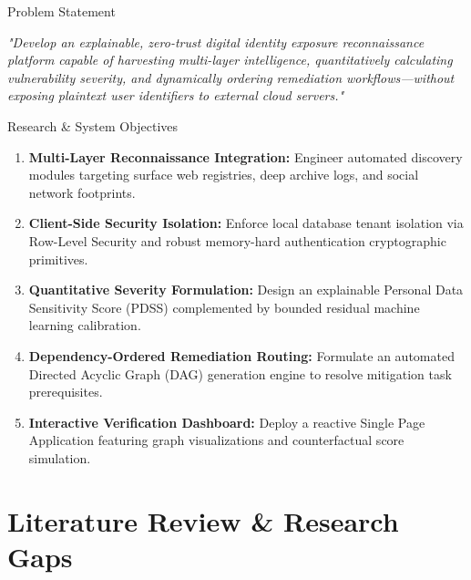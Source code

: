 \documentclass[aspectratio=169,10pt]{beamer}
\begin{document}
\begin{frame}{Problem Statement}
  \vspace{0.8cm}
  \Large
  \begin{center}
    \textit{"Develop an explainable, zero-trust digital identity exposure reconnaissance platform capable of harvesting multi-layer intelligence, quantitatively calculating vulnerability severity, and dynamically ordering remediation workflows—without exposing plaintext user identifiers to external cloud servers."}
  \end{center}
\end{frame}

\begin{frame}{Research \& System Objectives}
  \normalsize
  \vspace{0.1cm}
  \begin{enumerate}\setlength{\itemsep}{0.35cm}
    \item \textbf{Multi-Layer Reconnaissance Integration:} Engineer automated discovery modules targeting surface web registries, deep archive logs, and social network footprints.
    \item \textbf{Client-Side Security Isolation:} Enforce local database tenant isolation via Row-Level Security and robust memory-hard authentication cryptographic primitives.
    \item \textbf{Quantitative Severity Formulation:} Design an explainable Personal Data Sensitivity Score (PDSS) complemented by bounded residual machine learning calibration.
    \item \textbf{Dependency-Ordered Remediation Routing:} Formulate an automated Directed Acyclic Graph (DAG) generation engine to resolve mitigation task prerequisites.
    \item \textbf{Interactive Verification Dashboard:} Deploy a reactive Single Page Application featuring graph visualizations and counterfactual score simulation.
  \end{enumerate}
\end{frame}

\section{Literature Review \& Research Gaps}
\end{document}

